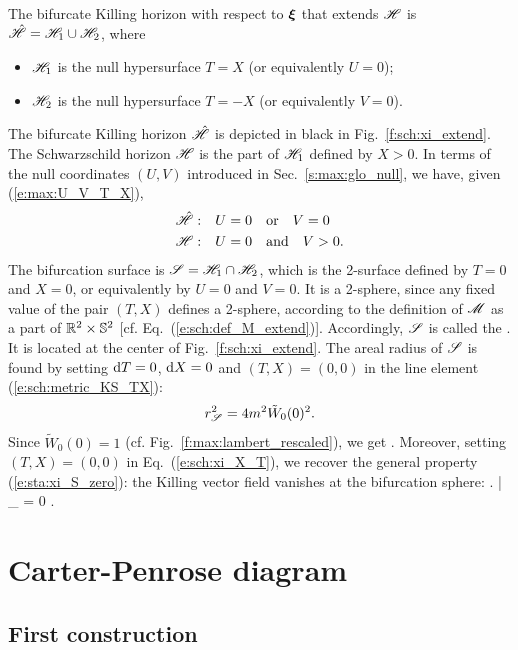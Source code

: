 The bifurcate Killing horizon with respect to $\bm{\xi}$
that extends $\mathscr{H}$
is $\hat{\mathscr{H}} = \mathscr{H}_1 \cup \mathscr{H}_2 $, where
\begin{itemize}
\item $\mathscr{H}_1$ is the null hypersurface $T=X$ (or equivalently $U=0$);
\item $\mathscr{H}_2$ is the null hypersurface $T=-X$ (or equivalently $V=0$).
\end{itemize}
The bifurcate Killing horizon $\hat{\mathscr{H}}$ is depicted in black in
Fig.~\ref{f:sch:xi_extend}.
The Schwarzschild horizon $\mathscr{H}$ is the part of $\mathscr{H}_1$ defined by $X>0$.
In terms of the null coordinates $(U,V)$ introduced in Sec.~\ref{s:max:glo_null},
we have, given (\ref{e:max:U_V_T_X}),
\begin{subequations}
\label{e:max:Hor_U_V}
\begin{align}
    \hat{\mathscr{H}}:\quad&  U = 0 \quad\mbox{or}\quad V = 0 \\
    \mathscr{H}:\quad &   U = 0 \quad\mbox{and}\quad V > 0 .
\end{align}
\end{subequations}
The bifurcation surface is $\mathscr{S} = \mathscr{H}_1 \cap \mathscr{H}_2$, which
is the 2-surface defined by $T=0$ and $X=0$, or equivalently by
$U=0$ and $V=0$. It is a 2-sphere, since
any fixed value of the pair $(T,X)$ defines a 2-sphere, according to the
definition of $\mathscr{M}$ as a part of $\mathbb{R}^2\times\mathbb{S}^2$
[cf. Eq.~(\ref{e:sch:def_M_extend})]. Accordingly, $\mathscr{S}$ is called the
. It is located at the
center of Fig.~\ref{f:sch:xi_extend}.
The areal radius of $\mathscr{S}$ is found by setting
$\mathrm{d} T = 0$, $\mathrm{d} X = 0$ and $(T,X)=(0,0)$ in the line element
(\ref{e:sch:metric_KS_TX}):
\[
    r_{\mathscr{S}}^2 = 4m^2 \tilde{W}_0(0)^2.
\]
Since $\tilde{W}_0(0)=1$ (cf. Fig.~\ref{f:max:lambert_rescaled}), we get
\be
     .
\ee
Moreover, setting $(T,X)=(0,0)$ in Eq.~(\ref{e:sch:xi_X_T}),
we recover the general property (\ref{e:sta:xi_S_zero}): the Killing
vector field vanishes at the bifurcation sphere:
\be
\left. \w{\xi} \right| _{\Sp} = 0 .
\ee


\section{Carter-Penrose diagram} \label{s:max:Carter-Penrose}

\subsection{First construction}

